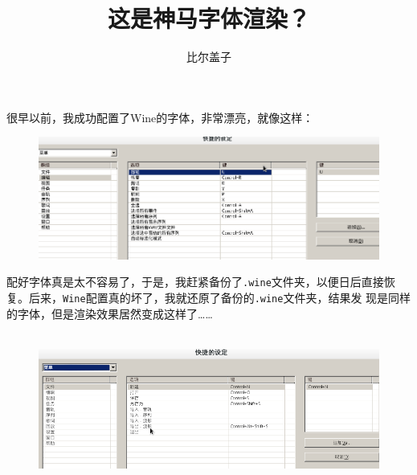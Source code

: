 \documentclass[slantfont,boldfont]{ctexart}
\begin{document}
\title{这是神马字体渲染？}
\author{比尔盖子}
\maketitle

很早以前，我成功配置了Wine的字体，非常漂亮，就像这样：
\begin{figure}[htbp]
    \includegraphics[width=12cm]{images/vocaloid-before.png}
    \centering
\end{figure}


配好字体真是太不容易了，于是，我赶紧备份了\verb|.wine|文件夹，以便日后直接恢复。后来，\verb|Wine|配置真的坏了，我就还原了备份的\verb|.wine|文件夹，结果发
现是同样的字体，但是渲染效果居然变成这样了……\\\\
\begin{figure}[htbp]
    \includegraphics[width=12cm]{images/vocaloid-now.png}
    \centering
\end{figure}
\end{document}

